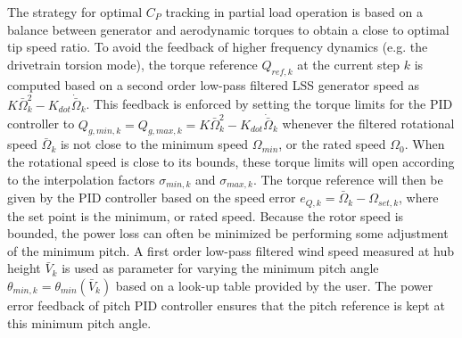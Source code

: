 The strategy for optimal $C_P$ tracking in partial load operation is based on a balance between generator and aerodynamic torques to obtain a close to optimal tip speed ratio. To avoid the feedback of higher frequency dynamics (e.g. the drivetrain torsion mode), the torque reference $Q_{ref,k}$ at the current step $k$ is computed based on a second order low-pass filtered LSS generator speed as $K \bar \Omega_k^2 - K_{dot} \dot{\bar \Omega}_k$. This feedback is enforced by setting the torque limits for the PID controller to $Q_{g,min,k}=Q_{g,max,k}=K\bar \Omega_k^2 - K_{dot} \dot{\bar \Omega}_k$ whenever the filtered rotational speed $\bar \Omega_k$ is not close to the minimum speed $\Omega_{min}$, or the rated speed $\Omega_0$. When the rotational speed is close to its bounds, these torque limits will open according to the interpolation factors $\sigma_{min,k}$ and $\sigma_{max,k}$. The torque reference will then be given by the PID controller based on the speed error $e_{Q,k}=\bar\Omega_k -\Omega_{set,k}$, where the set point is the minimum, or rated speed. Because the rotor speed is bounded, the power loss can often be minimized be performing some adjustment of the minimum pitch. A first order low-pass filtered wind speed measured at hub height $\bar V_k$ is used as parameter for varying the minimum pitch angle $\theta_{min,k}=\theta_{min}(\bar V_k)$ based on a look-up table provided by the user. The power error feedback of pitch PID controller ensures that the pitch reference is kept at this minimum pitch angle.

\begin{sidewaysfigure}
\centerline{ }
\caption{Diagram of the discrete controller. Note that $k$ denotes the current time step. \label{f:diagram}}
\end{sidewaysfigure}

\begin{sidewaysfigure}
\centerline{ }
\caption{Active routes during partial load operation in the controller diagram in Figure~\ref{f:diagram}. \label{f:diagram_part}}
\end{sidewaysfigure}

\begin{sidewaysfigure}
\centerline{ }
\caption{Active routes during full load operation in the controller diagram in Figure~\ref{f:diagram}. \label{f:diagram_full}}
\end{sidewaysfigure}

